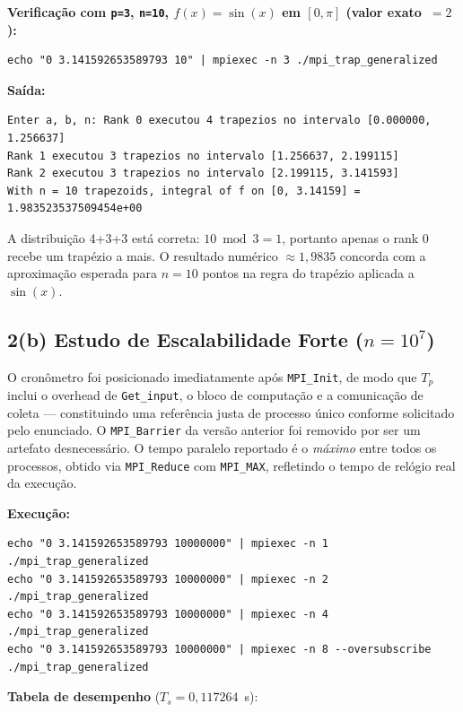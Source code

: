 \documentclass[12pt,a4paper]{article}
\begin{document}
\textbf{Verificação com \texttt{p=3}, \texttt{n=10}, $f(x)=\sin(x)$ em $[0,\pi]$ (valor exato~$= 2$):}

\begin{lstlisting}[style=shell]
echo "0 3.141592653589793 10" | mpiexec -n 3 ./mpi_trap_generalized
\end{lstlisting}

\textbf{Saída:}
\begin{lstlisting}[style=shell]
Enter a, b, n: Rank 0 executou 4 trapezios no intervalo [0.000000, 1.256637]
Rank 1 executou 3 trapezios no intervalo [1.256637, 2.199115]
Rank 2 executou 3 trapezios no intervalo [2.199115, 3.141593]
With n = 10 trapezoids, integral of f on [0, 3.14159] = 1.983523537509454e+00
\end{lstlisting}

A distribuição 4+3+3 está correta: $10 \bmod 3 = 1$, portanto apenas o rank 0 recebe um trapézio a mais. O resultado numérico $\approx 1{,}9835$ concorda com a aproximação esperada para $n=10$ pontos na regra do trapézio aplicada a $\sin(x)$.

\subsection{2(b) Estudo de Escalabilidade Forte ($n=10^7$)}

O cronômetro foi posicionado imediatamente após \texttt{MPI\_Init}, de modo que $T_p$ inclui o overhead de \texttt{Get\_input}, o bloco de computação e a comunicação de coleta — constituindo uma referência justa de processo único conforme solicitado pelo enunciado. O \texttt{MPI\_Barrier} da versão anterior foi removido por ser um artefato desnecessário. O tempo paralelo reportado é o \emph{máximo} entre todos os processos, obtido via \texttt{MPI\_Reduce} com \texttt{MPI\_MAX}, refletindo o tempo de relógio real da execução.

\textbf{Execução:}
\begin{lstlisting}[style=shell]
echo "0 3.141592653589793 10000000" | mpiexec -n 1 ./mpi_trap_generalized
echo "0 3.141592653589793 10000000" | mpiexec -n 2 ./mpi_trap_generalized
echo "0 3.141592653589793 10000000" | mpiexec -n 4 ./mpi_trap_generalized
echo "0 3.141592653589793 10000000" | mpiexec -n 8 --oversubscribe ./mpi_trap_generalized
\end{lstlisting}

\textbf{Tabela de desempenho} ($T_s = 0{,}117264$~s):
\end{document}
